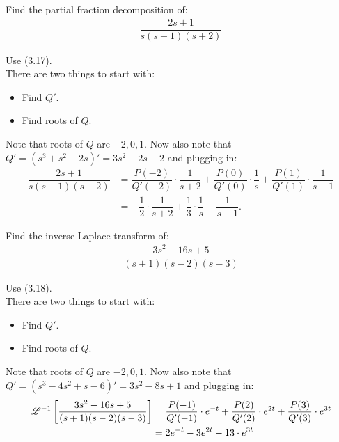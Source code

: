 \documentclass[11pt]{article}
\begin{document}
    \newpage
    \begin{problem}
        Find the partial fraction decomposition of:
        \begin{align}
            \dfrac{2s+1}{s(s-1)(s+2)}
        \end{align}
    \end{problem}
    \begin{solution}
        Use (3.17). \\
        There are two things to start with:
        \begin{itemize}
            \item Find $Q'$.
            \item Find roots of $Q$.
        \end{itemize}
        Note that roots of $Q$ are $-2,0,1$. Now also note that $Q' = (s^3+s^2-2s)' = 3s^2+2s-2$ and plugging in:
        \begin{align}
            \dfrac{2s+1}{s(s-1)(s+2)} &= \dfrac{P(-2)}{Q'(-2)} \cdot \dfrac{1}{s+2} + \dfrac{P(0)}{Q'(0)} \cdot \dfrac{1}{s} + \dfrac{P(1)}{Q'(1)} \cdot \dfrac{1}{s-1} \\
            &= -\dfrac{1}{2} \cdot \dfrac{1}{s+2} + \dfrac{1}{3} \cdot \dfrac{1}{s} + \dfrac{1}{s-1}.
        \end{align}
    \end{solution}
    \begin{problem}
        Find the inverse Laplace transform of:
        \begin{align}
            \dfrac{3s^2-16s+5}{(s+1)(s-2)(s-3)}
        \end{align}
    \end{problem}
    \begin{solution}
        Use (3.18). \\
        There are two things to start with:
        \begin{itemize}
            \item Find $Q'$.
            \item Find roots of $Q$.
        \end{itemize}
        Note that roots of $Q$ are $-2,0,1$. Now also note that $Q' = (s^3-4s^2+s-6)' = 3s^2-8s+1$ and plugging in:
        \begin{align}
            \mathscr L^{-1} \left[\dfrac{3s^2-16s+5}{(s+1)(s-2)(s-3)}\right] &= \dfrac{P(-1)}{Q'(-1)} \cdot e^{-t} + \dfrac{P(2)}{Q'(2)} \cdot e^{2t} + \dfrac{P(3)}{Q'(3)} \cdot e^{3t} \\
            &= 2e^{-t}-3e^{2t} -13 \cdot e^{3t} \\
        \end{align}
    \end{solution}
\end{document}

